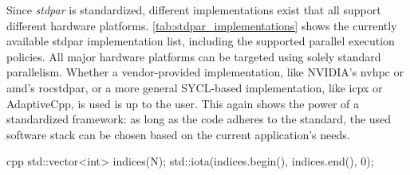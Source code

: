Since \textit{stdpar} is standardized, different implementations exist that all support different hardware platforms. 
\autoref{tab:stdpar_implementations} shows the currently available stdpar implementation list, including the supported parallel execution policies. 
All major hardware platforms can be targeted using solely \cpp standard parallelism. 
Whether a vendor-provided implementation, like NVIDIA's nvhpc or \gls{amd}'s rocstdpar, or a more general SYCL-based implementation, like icpx or AdaptiveCpp, is used is up to the user. 
This again shows the power of a standardized framework: as long as the code adheres to the standard, the used software stack can be chosen based on the current application's needs. 


\begin{listing}
    \begin{moderncode}{cpp}
std::vector<int> indices(N);
std::iota(indices.begin(), indices.end(), 0);


\end{moderncode}
\end{listing}
